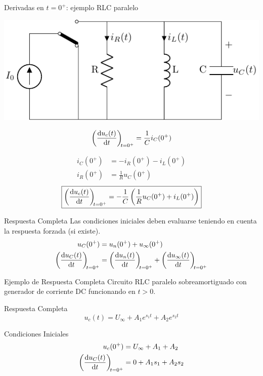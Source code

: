 \documentclass[aspectratio=169, usenames,svgnames,dvipsnames]{beamer}
\begin{document}
\begin{frame}[label={sec:orga649e51}]{Derivadas en \(t = 0^+\): ejemplo RLC paralelo}
\begin{center}
\includegraphics[height=0.25\textheight]{../figs/transitorio_circuitoRLC_paralelo_t0+.pdf}
\end{center}

\[
  \diff{u_c(t)}{t}[t = 0^+] = \frac{1}{C}i_C(0^+)
\]

\begin{align*}
  i_C(0^+) &= -i_R(0^+) - i_L(0^+)\\
  i_R(0^+) &= \frac{1}{R} u_C(0^+)
\end{align*}
\[
  \boxed{\diff{u_c(t)}{t}[t = 0^+] = - \frac{1}{C} \left( \frac{1}{R} u_C(0^+) +  i_L(0^+)\right)}
\]
\end{frame}


\begin{frame}[label={sec:org19820ab}]{Respuesta Completa}
Las condiciones iniciales deben evaluarse teniendo en cuenta la respuesta forzada (si existe).
\begin{align*}
  u_C(0^+) &= u_n(0^+) + u_{\infty}(0^+)\\
  \diff{u_C(t)}{t}[t = 0^+] &= \diff{u_n(t)}{t}[t = 0^+] + \diff{u_{\infty}(t)}{t}[t = 0^+]  
\end{align*}
\end{frame}

\begin{frame}[label={sec:orgd34ebb2}]{Ejemplo de Respuesta Completa}
Circuito RLC paralelo sobreamortiguado con generador de corriente DC funcionando en \(t > 0\). 

\begin{block}{Respuesta Completa}
\[
  u_c(t) = U_{\infty} + A_1 e^{s_1 t} + A_2 e^{s_2 t}
\]
\end{block}

\begin{block}{Condiciones Iniciales}
\begin{align*}
u_c(0^+) &= U_\infty + A_1 + A_2\\
\diff{u_C(t)}{t}[t = 0^+] &= 0 + A_1 s_1 + A_2 s_2
\end{align*}
\end{block}
\end{frame}
\end{document}
